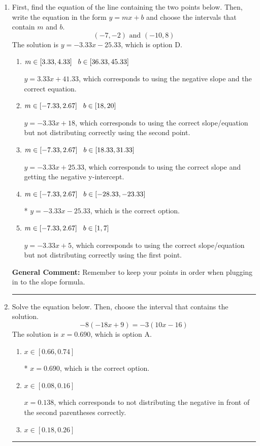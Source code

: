 \documentclass{extbook}[14pt]
\newcommand{\litem}[1]{\item #1

\rule{\textwidth}{0.4pt}}
\begin{document}
\begin{enumerate}\litem{
First, find the equation of the line containing the two points below. Then, write the equation in the form $ y=mx+b $ and choose the intervals that contain $m$ and $b$.
\[ (-7, -2) \text{ and } (-10, 8) \]The solution is \( y = -3.33x -25.33 \), which is option D.\begin{enumerate}[label=\Alph*.]
\item \( m \in [3.33, 4.33] \hspace*{3mm} b \in [36.33, 45.33] \)

 $y = 3.33x + 41.33$, which corresponds to using the negative slope and the correct equation.
\item \( m \in [-7.33, 2.67] \hspace*{3mm} b \in [18, 20] \)

 $y = -3.33x + 18$, which corresponds to using the correct slope/equation but not distributing correctly using the second point.
\item \( m \in [-7.33, 2.67] \hspace*{3mm} b \in [18.33, 31.33] \)

 $y = -3.33x + 25.33$, which corresponds to using the correct slope and getting the negative y-intercept.
\item \( m \in [-7.33, 2.67] \hspace*{3mm} b \in [-28.33, -23.33] \)

* $y = -3.33x -25.33$, which is the correct option.
\item \( m \in [-7.33, 2.67] \hspace*{3mm} b \in [1, 7] \)

 $y = -3.33x + 5$, which corresponds to using the correct slope/equation but not distributing correctly using the first point.
\end{enumerate}

\textbf{General Comment:} Remember to keep your points in order when plugging in to the slope formula.
}
\litem{
Solve the equation below. Then, choose the interval that contains the solution.
\[ -8(-18x + 9) = -3(10x -16) \]The solution is \( x = 0.690 \), which is option A.\begin{enumerate}[label=\Alph*.]
\item \( x \in [0.66, 0.74] \)

* $x = 0.690$, which is the correct option.
\item \( x \in [0.08, 0.16] \)

$x = 0.138$, which corresponds to not distributing the negative in front of the second parentheses correctly.
\item \( x \in [0.18, 0.26] \)


\end{enumerate}}
\end{enumerate}
\end{document}
